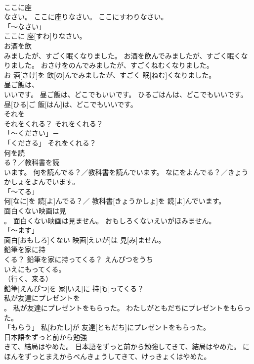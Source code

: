 \documentclass[8pt]{extreport}
\begin{document}
\begin{CJK}{UTF8}{min}
\\	ここに座
\\	なさい。	ここに座りなさい。	ここにすわりなさい。	
\\	「～なさい」 
\\	ここに 座[すわ]りなさい。		
\\	お酒を飲
\\	みましたが、すごく眠くなりました。	お酒を飲んでみましたが、すごく眠くなりました。	おさけをのんでみましたが、すごくねむくなりました。	
\\	お 酒[さけ]を 飲[の]んでみましたが、すごく 眠[ねむ]くなりました。		
\\	昼ご飯は、
\\	いいです。	昼ご飯は、どこでもいいです。	ひるごはんは、どこでもいいです。	
\\	昼[ひる]ご 飯[はん]は、どこでもいいです。		
\\	それを
\\	それをくれる？	それをくれる？	
\\	「～ください」－ 
\\	「くださる」	それをくれる？		
\\	何を読
\\	る？／教科書を読
\\	います。	何を読んでる？／教科書を読んでいます。	なにをよんでる？／きょうかしょをよんでいます。	
\\	「～てる」 
\\	何[なに]を 読[よ]んでる？／ 教科書[きょうかしょ]を 読[よ]んでいます。		
\\	面白くない映画は見
\\	。	面白くない映画は見ません。	おもしろくないえいがほみません。	
\\	「～ます」 
\\	面白[おもしろ]くない 映画[えいが]は 見[み]ません。		
\\	鉛筆を家に持
\\	くる？	鉛筆を家に持ってくる？	えんぴつを{うち
\\	いえ}にもってくる。	
\\	（行く、来る） 
\\	鉛筆[えんぴつ]を 家[いえ]に 持[も]ってくる？		
\\	私が友達にプレゼントを
\\	。	私が友達にプレゼントをもらった。	わたしがともだちにプレゼントをもらった。	
\\	「もらう」	私[わたし]が 友達[ともだち]にプレゼントをもらった。		
\\	日本語をずっと前から勉強
\\	きて、結局はやめた。	日本語をずっと前から勉強してきて、結局はやめた。	にほんをずっとまえからべんきょうしてきて、けっきょくはやめた。	

\end{CJK}
\end{document}
